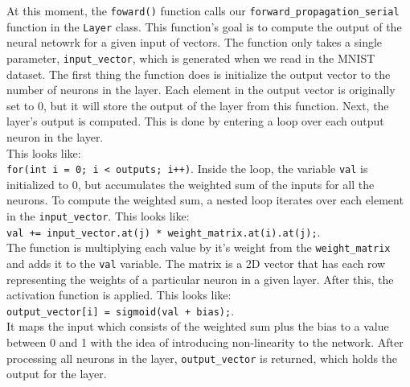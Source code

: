 \documentclass[12pt, twocolumn]{report}
\begin{document}
At this moment, the \texttt{foward()} function calls our \texttt{forward\_propagation\_serial} function in the \texttt{Layer} class. This function's goal is to compute the output of the neural netowrk for a given input
of vectors. The function only takes a single parameter, \texttt{input\_vector}, which is generated when we read in the MNIST dataset. The first thing the function does
is initialize the output vector to the number of neurons in the layer. Each element in the output vector is originally set to 0, but it will store the output of the layer from this
function. Next, the layer's output is computed. This is done by entering a loop over each output neuron in the layer. \\ This looks like: \\ \texttt{for(int i = 0; i < outputs; i++)}. Inside the loop,
the variable \texttt{val} is initialized to 0, but accumulates the weighted sum of the inputs for all the neurons. To compute the weighted sum, a nested loop iterates over
each element in the \texttt{input\_vector}. This looks like: \\ \texttt{val += input\_vector.at(j) * weight\_matrix.at(i).at(j);}. \\ The function is multiplying each value by it's weight
from the \texttt{weight\_matrix} and adds it to the \texttt{val} variable. The matrix is a 2D vector that has each row representing the weights
of a particular neuron in a given layer. After this, the activation function is applied. This looks like: \\ \texttt{output\_vector[i] = sigmoid(val + bias);}. \\ It maps the input
which consists of the weighted sum plus the bias to a value between 0 and 1 with the idea of introducing non-linearity to the network. After processing all neurons
in the layer, \texttt{output\_vector} is returned, which holds the output for the layer.
\\
\end{document}
